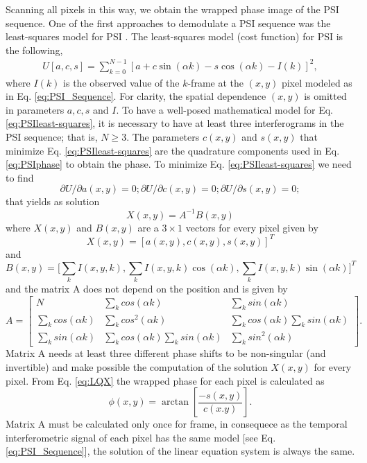 Scanning all pixels in this way, we obtain the wrapped phase image of
the PSI sequence. One of the first approaches to demodulate a PSI
sequence was the least-squares model for PSI
\cite{Morgan,Greivenkamp,Okada,Kong}. The least-squares model (cost function) 
for PSI is the following,
\begin{align}\label{eq:PSIleast-squares}
  U[a,c,s]= \sum_{k=0}^{N-1}\left[a + c \sin(\alpha k)\right.
  -\left. s \cos(\alpha k)-I(k) \right]^2,
\end{align}
where $I(k)$ is the observed value of the $k$-frame at the
$(x,y)$ pixel modeled as in Eq. \eqref{eq:PSI_Sequence}. For clarity, 
the spatial dependence $(x,y)$ is omitted in parameters $a,c,s$ and $I$.
To have a well-posed mathematical model for Eq. \eqref{eq:PSIleast-squares},
it is necessary to have at least three interferograms in the PSI sequence;
that is, $N\geq 3$. The parameters $c(x,y)$ and $s(x,y)$ that minimize Eq. 
\eqref{eq:PSIleast-squares} are the quadrature components used in Eq. 
\eqref{eq:PSIphase} to obtain the phase. To minimize Eq. 
\eqref{eq:PSIleast-squares} we need to find
\begin{equation}
 \partial U/ \partial a(x,y)=0; \partial U/ \partial c(x,y)=0; 
\partial U/ \partial s(x,y)=0;
\end{equation}
that yields as solution
\begin{equation}
 X(x,y)=A^{-1}B(x,y)
\end{equation}
where $X(x,y)$ and $B(x,y)$ are a $3 \times 1$ vectors for every pixel given by
\begin{equation}\label{eq:LQX}
 X(x,y)=[a(x,y),c(x,y),s(x,y)]^T
\end{equation}
and
\begin{equation}
 B(x,y)=\bigg[\sum_k I(x,y,k),\sum_k I(x,y,k) \cos(\alpha k),
 \sum_k I(x,y,k) \sin(\alpha k) \bigg]^T
\end{equation}
and the matrix A does not depend on the position and is given by
\begin{equation}
A=\left[\begin{array}{ccc}
N & \sum_{k}cos(\alpha k) & \sum_{k}sin(\alpha k)\\
\sum_{k}cos(\alpha k) & \sum_{k}cos^{2}(\alpha k) & \sum_{k}cos(\alpha k)
\sum_{k}sin(\alpha k)\\
\sum_{k}sin(\alpha k) & \sum_{k}cos(\alpha k)\sum_{k}sin(\alpha k) & 
\sum_{k}sin^{2}(\alpha k)\end{array}\right].
\end{equation}
Matrix A needs at least three different phase shifts to be non-singular (and 
invertible) and make possible the computation of the solution $X(x,y)$ for every
pixel. From Eq. \eqref{eq:LQX} the wrapped phase for each pixel is calculated as
\begin{equation}
 \phi(x,y)=\arctan\left[\frac{-s(x,y)}{c(x.y)} \right].
\end{equation}
Matrix A must be calculated only once for frame, in consequece as the temporal 
interferometric signal of each pixel has the same model 
[see Eq. \eqref{eq:PSI_Sequence}], the solution of the linear equation system is 
always the same.

